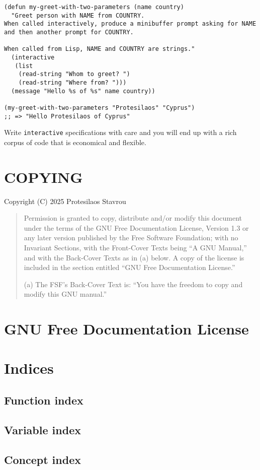 \documentclass[11pt]{ctexart}
\begin{document}
\begin{verbatim}
(defun my-greet-with-two-parameters (name country)
  "Greet person with NAME from COUNTRY.
When called interactively, produce a minibuffer prompt asking for NAME
and then another prompt for COUNTRY.

When called from Lisp, NAME and COUNTRY are strings."
  (interactive
   (list
    (read-string "Whom to greet? ")
    (read-string "Where from? ")))
  (message "Hello %s of %s" name country))

(my-greet-with-two-parameters "Protesilaos" "Cyprus")
;; => "Hello Protesilaos of Cyprus"
\end{verbatim}

Write \texttt{interactive} specifications with care and you will end up with a rich corpus of code that is economical and flexible.
\section{COPYING}
\label{sec:orgf1e6bff}
Copyright (C) 2025 Protesilaos Stavrou

\begin{quote}
Permission is granted to copy, distribute and/or modify this document
under the terms of the GNU Free Documentation License, Version 1.3 or
any later version published by the Free Software Foundation; with no
Invariant Sections, with the Front-Cover Texts being “A GNU Manual,” and
with the Back-Cover Texts as in (a) below.  A copy of the license is
included in the section entitled “GNU Free Documentation License.”

(a) The FSF’s Back-Cover Text is: “You have the freedom to copy and
modify this GNU manual.”
\end{quote}
\section{GNU Free Documentation License}
\label{sec:org476d4b3}
\section{Indices}
\label{sec:orgad3448b}
\subsection{Function index}
\label{sec:orgd40472b}
\subsection{Variable index}
\label{sec:org9f0acee}
\subsection{Concept index}
\label{sec:orgf087f0c}
\end{document}
